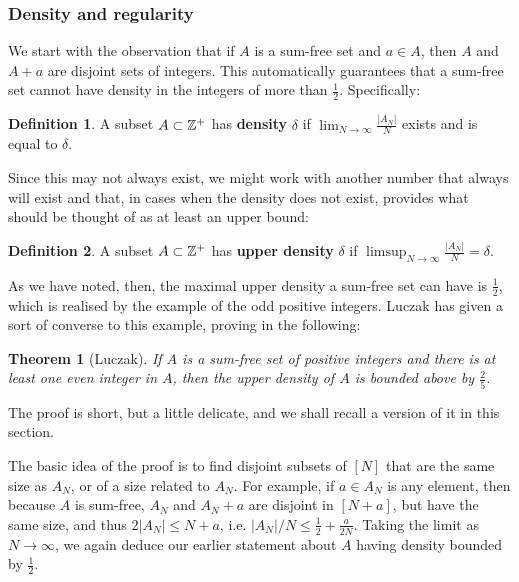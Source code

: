 \documentclass{article}
\newtheorem{theorem}{Theorem}[section]
\theoremstyle{definition}
\newtheorem{definition}{Definition}
\theoremstyle{remark}
\numberwithin{equation}{section}
\begin{document}
\subsubsection{Density and regularity}

We start with the observation that if $A$ is a sum-free set and
$a \in A$, then $A$ and $A+a$ are disjoint sets of integers.  This
automatically guarantees that a sum-free set cannot have density in
the integers of more than $\frac12$.  Specifically: 

\begin{definition}
  A subset $A \subset \mathbb{Z}^+$ has \textbf{density} $\delta$ if
  $\lim_{N \to \infty} \frac{|A_N|}{N}$ exists and is equal to
  $\delta$.
\end{definition}

Since this may not always exist, we might work with another number
that always will exist and that, in cases when the density does not
exist, provides what should be thought of as at least an upper bound: 

\begin{definition}
  A subset $A \subset \mathbb{Z}^+$ has \textbf{upper density} $\delta$ if
  $\limsup_{N \to \infty}\frac{|A_N|}{N} = \delta$.
\end{definition}

As we have noted, then, the maximal upper density a sum-free set can
have is $\frac12$, which is realised by the example of the odd
positive integers.  Luczak has given a sort of converse to this
example, proving in \cite{luczak:jct1995} the following: 

\begin{theorem}[Luczak]
If $A$ is a sum-free set of positive integers and there is at least
one even integer in $A$, then the upper density of $A$ is bounded
above by $\frac25$.  
\end{theorem}  

The proof is short, but a
little delicate, and we shall recall a version of it in this section.

The basic idea of the proof is to find disjoint subsets of $[N]$ that
are the same size as $A_N$, or of a size related to $A_N$.  For
example, if $a \in A_N$ is any element, then because $A$ is sum-free,
$A_N$ and $A_N+a$ are disjoint in $[N+a]$, but have the same size, and
thus $2|A_N| \leq N+a$, i.e. $|A_N|/N \leq \frac12 + \frac{a}{2N}$.
Taking the limit as $N \to \infty$, we again deduce our earlier
statement about $A$ having density bounded by $\frac12$.
\end{document}
